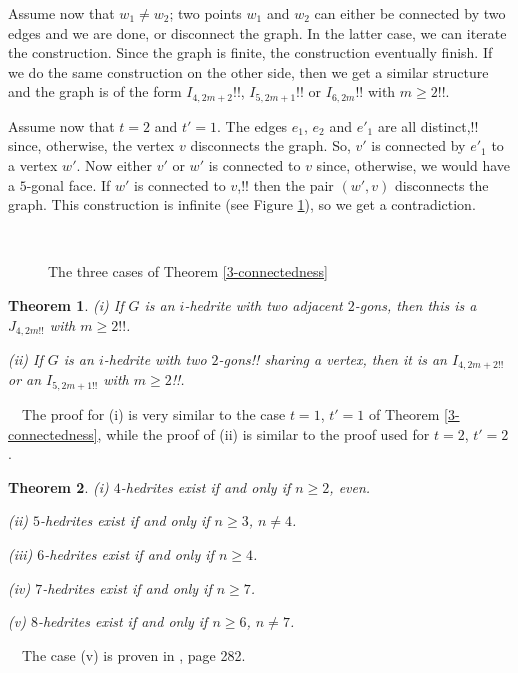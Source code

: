 \documentclass[12pt]{article}
\newtheorem{theor}{Theorem}
\newcommand{\proof}{\noindent{\bf Proof.}\ \ }
\begin{document}
Assume now that $w_1\not= w_2$; two points $w_1$ and $w_2$ can 
either be connected by two edges and we are done, or disconnect the
graph. In the latter case, we can iterate the construction. Since the 
graph is finite, the construction eventually finish. If we do the same
construction on the other side, then we get a similar structure and the 
graph is of the form $I_{4,2m+2}$!!, $I_{5, 2m+1}$!! or $I_{6,2m}$!! 
with $m\geq 2!!$.


Assume now that $t=2$ and $t'=1$. The edges $e_1$, $e_2$ and $e'_1$ are
all distinct,!! since, otherwise, the vertex $v$ disconnects the graph.
So, $v'$ is connected by $e'_1$ to a vertex $w'$. Now either $v'$ or $w'$
is connected to $v$ since, otherwise, we would have a $5$-gonal face.
If $w'$ is connected to $v$,!! then the pair $(w', v)$ disconnects the graph.
This construction is infinite (see Figure \ref{fig:TheThreeCases}), so
we get a contradiction.




\begin{figure}
\centering
\mbox{
}
\caption{The three cases of Theorem \ref{3-connectedness}}
\label{fig:TheThreeCases}
\end{figure}



\begin{theor}
(i) If $G$ is an $i$-hedrite with two adjacent $2$-gons, then 
this is a $J_{4,2m!!}$ with $m\geq 2!!$.

(ii) If $G$ is an $i$-hedrite with two $2$-gons!! sharing a 
vertex, then it is an $I_{4,2m+2!!}$ or an $I_{5,2m+1!!}$ with
$m\geq 2$!!.

\end{theor}

\proof The proof for (i) is very similar to the case $t=1$, $t'=1$ of Theorem \ref{3-connectedness}, while the proof of (ii) is similar to the proof used for $t=2$, $t'=2$.





\begin{theor}

(i) $4$-hedrites exist if and only if $n\geq 2$, even.

(ii) $5$-hedrites exist if and only if $n\geq 3$, $n\not= 4$.

(iii) $6$-hedrites exist if and only if $n\geq 4$.

(iv) $7$-hedrites exist if and only if $n\geq 7$.

(v) $8$-hedrites exist if and only if $n\geq 6$, $n\not= 7$.

\end{theor}
\proof The case (v) is proven in \cite{Gr}, page 282.
\end{document}
